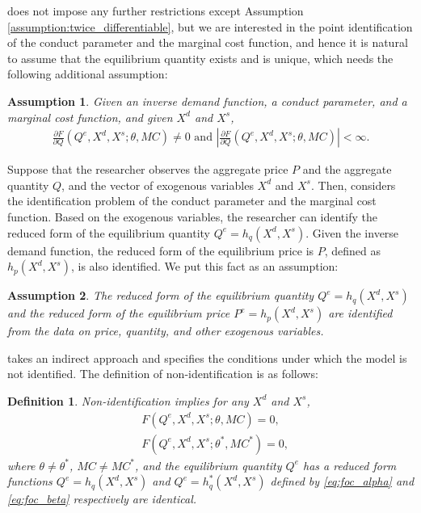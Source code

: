 \documentclass[11pt, a4paper]{article}
\newtheorem{assumption}{Assumption}
\newtheorem{definition}{Definition}
\theoremstyle{remark}
\begin{document}
\citet{lau1982identifying} does not impose any further restrictions except Assumption \ref{assumption:twice_differentiable}, but we are interested in the point identification of the conduct parameter and the marginal cost function, and hence it is natural to assume that the equilibrium quantity exists and is unique, which needs the following additional assumption:
\begin{assumption}\label{assumption:unique_equilibrium}
    Given an inverse demand function, a conduct parameter, and a marginal cost function, and given $X^{d}$ and $X^{s}$,
    \begin{align}
        \frac{\partial F}{\partial Q}(Q^{e}, X^{d}, X^{s}; \theta, MC) \ne 0 \text{ and } \left| \frac{\partial F}{\partial Q}(Q^{e}, X^{d}, X^{s}; \theta, MC)\right| < \infty. 
    \end{align}
\end{assumption}


Suppose that the researcher observes the aggregate price $P$ and the aggregate quantity $Q$, and the vector of exogenous variables $X^{d}$ and $X^{s}$.
Then, \citet{lau1982identifying} considers the identification problem of the conduct parameter and the marginal cost function.
Based on the exogenous variables, the researcher can identify the reduced form of the equilibrium quantity $Q^e = h_q(X^{d}, X^{s})$.
Given the inverse demand function, the reduced form of the equilibrium price is $P$, defined as $h_p(X^{d}, X^{s})$, is also identified.
We put this fact as an assumption:
\begin{assumption}\label{assumption:reduced_form_identification}
    The reduced form of the equilibrium quantity $Q^e = h_q(X^{d}, X^{s})$ and the reduced form of the equilibrium price $P^e = h_p(X^{d}, X^{s})$ are identified from the data on price, quantity, and other exogenous variables.
\end{assumption}









\citet{lau1982identifying} takes an indirect approach and specifies the conditions under which the model is not identified.
The definition of non-identification is as follows:
\begin{definition}\label{def:non_identification}
Non-identification implies for any $X^{d}$ and $X^{s}$,
\begin{align}
& F(Q^e, X^{d}, X^{s}; \theta, MC) = 0,  \label{eq:foc_alpha}\\
& F(Q^e, X^{d}, X^{s}; \theta^{*}, MC^{*}) = 0,\label{eq:foc_beta}
\end{align}
where $\theta \neq \theta^{*}$, $MC \ne MC^{*}$, and the equilibrium quantity $Q^e$ has a reduced form functions $Q^e = h_q(X^{d}, X^{s})$ and $Q^e = h_q^{*}(X^{d}, X^{s})$ defined by \eqref{eq:foc_alpha} and \eqref{eq:foc_beta} respectively are identical.
\end{definition}
\end{document}
